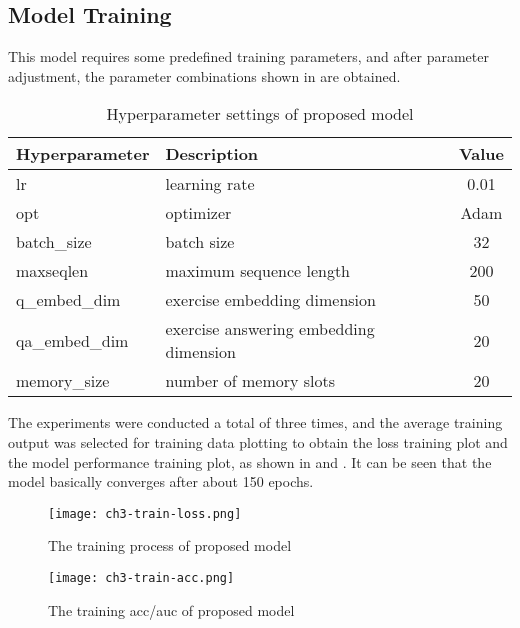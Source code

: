 \subsection{Model Training}
This model requires some predefined training parameters, and after parameter adjustment, the parameter combinations shown in \tblname{\ref{tbl:ch3-hpsetting}} are obtained.
\begin{table}[htbp!]
    \caption{Hyperparameter settings of proposed model}\label{tbl:ch3-hpsetting}
    \centering
    \begin{tabular}{l l c}
        \toprule
        Hyperparameter & Description                             & Value \\
        \midrule
        lr             & learning rate                           & 0.01  \\
        opt            & optimizer                               & Adam  \\
        batch\_size    & batch size                              & 32    \\
        maxseqlen      & maximum sequence length                 & 200   \\
        q\_embed\_dim  & exercise embedding dimension            & 50    \\
        qa\_embed\_dim & exercise  answering embedding dimension & 20    \\
        memory\_size   & number of memory slots                  & 20    \\
        \bottomrule
    \end{tabular}
\end{table}
The experiments were conducted a total of three times, and the average training output was selected for training data plotting to obtain the loss training plot and the model performance training plot, as shown in \figname{\ref{fig:ch3-train-loss}} and \figname{\ref{fig:ch3-train-acc}}. It can be seen that the model basically converges after about 150 epochs.
\begin{figure}[htb]
    \centering
    \texttt{[image: ch3-train-loss.png]}
    \caption{The training process of proposed model}\label{fig:ch3-train-loss}
\end{figure}

\begin{figure}[htb]
    \centering
    \texttt{[image: ch3-train-acc.png]}
    \caption{The training acc/auc of proposed model}\label{fig:ch3-train-acc}
\end{figure}

